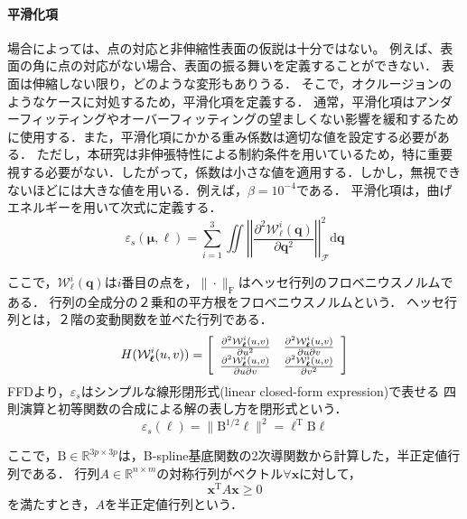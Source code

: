 \documentclass[10.5pt,twocolumn,a4j,fleqn]{ujarticle}
\begin{document}
\paragraph{平滑化項}
場合によっては、点の対応と非伸縮性表面の仮説は十分ではない。
例えば、表面の角に点の対応がない場合、表面の振る舞いを定義することができない．
表面は伸縮しない限り，どのような変形もありうる．
そこで，オクルージョンのようなケースに対処するため，平滑化項を定義する．
通常，平滑化項はアンダーフィッティングやオーバーフィッティングの望ましくない影響を緩和するために使用する．また，平滑化項にかかる重み係数は適切な値を設定する必要がある．
ただし，本研究は非伸張特性による制約条件を用いているため，特に重要視する必要がない．したがって，係数は小さな値を適用する．しかし，無視できないほどには大きな値を用いる．例えば，$\beta = 10^{-4}$である．
平滑化項は，曲げエネルギーを用いて次式に定義する．
\begin{equation}
    \varepsilon_s(\bm{\mu}, \bm{\ell}) = \sum_{i=1}^3 \iint \left|\left| \frac{\partial^2\mathcal{W}_{\bm{\ell}}^i(\mathrm{\bm{q}})}{\partial\mathrm{\bm{q}}^2} \right|\right|_{\mathcal{F}}^2 \mathrm{d \bm{q}}
\end{equation}

ここで，$\mathcal{W}_{\bm{\ell}}^i(\mathrm{\bm{q}})$は$i$番目の点を，$\|\cdot\|_\mathrm{F}$はヘッセ行列のフロベニウスノルムである．
行列の全成分の２乗和の平方根をフロベニウスノルムという．
ヘッセ行列とは，２階の変動関数を並べた行列である．
\begin{equation}
    H(\mathcal{W}_{\bm{\ell}}^i(u,v))=
    \left[
        \begin{array}{c c}
            \frac{\partial^2\mathcal{W}_{\bm{\ell}}^i(u,v)}{\partial u^2} & \frac{\partial^2\mathcal{W}_{\bm{\ell}}^i(u,v)}{\partial u \partial v}  \\
            \frac{\partial^2\mathcal{W}_{\bm{\ell}}^i(u,v)}{\partial u \partial v} & \frac{\partial^2\mathcal{W}_{\bm{\ell}}^i(u,v)}{\partial v^2}
        \end{array}
    \right]
\end{equation}
FFDより，$\varepsilon_s$はシンプルな線形閉形式(linear closed-form expression)で表せる
四則演算と初等関数の合成による解の表し方を閉形式という．
\begin{equation}
    \varepsilon_s(\bm{\ell}) = \|\mathrm{B}^{1/2}\bm{\ell}\|^2 = \bm{\ell}^{\mathrm{T}}\mathrm{B}\bm{\ell}
\end{equation}

ここで，$\mathrm{B} \in \mathbb{R}^{3p\times3p}$は，B-spline基底関数の2次導関数から計算した，半正定値行列である．
行列$A \in \mathbb{R}^{n\times m}$の対称行列がベクトル$\forall \mathrm{\bm{x}}$に対して，
\begin{equation*}
    \mathrm{\bm{x}}^{\mathrm{T}} A \mathrm{\bm{x}} \geq 0
\end{equation*}
を満たすとき，$A$を半正定値行列という．
\end{document}
